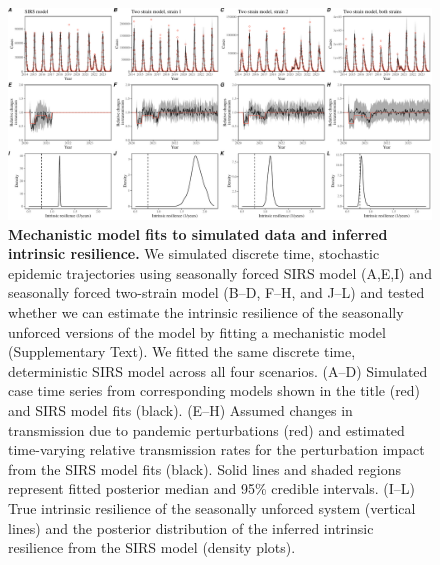 \documentclass[12pt]{article}
\begin{document}
\begin{figure}[!th]
\includegraphics[width=\textwidth]{../figure_fit/figure_fit.pdf}
\caption{
\textbf{Mechanistic model fits to simulated data and inferred intrinsic resilience.}
We simulated discrete time, stochastic epidemic trajectories using seasonally forced SIRS model (A,E,I) and seasonally forced two-strain model (B--D, F--H, and J--L) and tested whether we can estimate the intrinsic resilience of the seasonally unforced versions of the model by fitting a mechanistic model (Supplementary Text).
We fitted the same discrete time, deterministic SIRS model across all four scenarios.
(A--D) Simulated case time series from corresponding models shown in the title (red) and SIRS model fits (black).
(E--H) Assumed changes in transmission due to pandemic perturbations (red) and estimated time-varying relative transmission rates for the perturbation impact from the SIRS model fits (black).
Solid lines and shaded regions represent fitted posterior median and 95\% credible intervals.
(I--L) True intrinsic resilience of the seasonally unforced system (vertical lines) and the posterior distribution of the inferred intrinsic resilience from the SIRS model (density plots).
}
\end{figure}


\pagebreak
\end{document}
